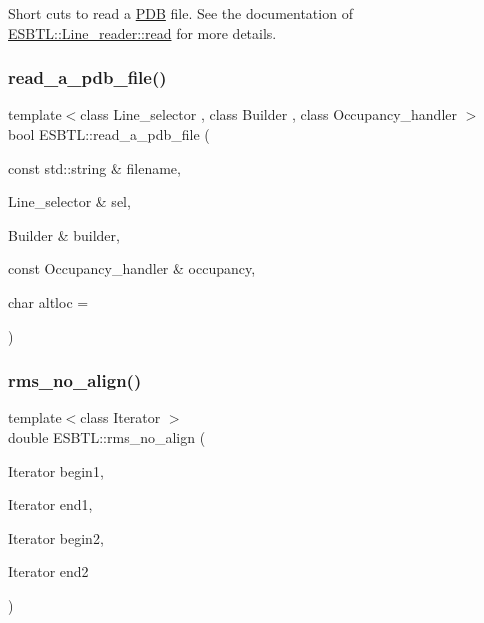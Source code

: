 Short cuts to read a \hyperlink{namespaceESBTL_1_1PDB}{P\+DB} file. See the documentation of \hyperlink{classESBTL_1_1Line__reader_aaf4f352f79c0bc1fc2afb52afd4f751f}{E\+S\+B\+T\+L\+::\+Line\+\_\+reader\+::read} for more details. \mbox{\label{namespaceESBTL_a28936dc2a8755e244e063f40553c1b71}} 
\subsubsection{\texorpdfstring{read\+\_\+a\+\_\+pdb\+\_\+file()}{read\_a\_pdb\_file()}\hspace{0.1cm}{\footnotesize\ttfamily [2/2]}}
{\footnotesize\ttfamily template$<$class Line\+\_\+selector , class Builder , class Occupancy\+\_\+handler $>$ \\
bool E\+S\+B\+T\+L\+::read\+\_\+a\+\_\+pdb\+\_\+file (\begin{DoxyParamCaption}\item[{const std\+::string \&}]{filename,  }\item[{Line\+\_\+selector \&}]{sel,  }\item[{Builder \&}]{builder,  }\item[{const Occupancy\+\_\+handler \&}]{occupancy,  }\item[{char}]{altloc = {\ttfamily \textquotesingle{}~\textquotesingle{}} }\end{DoxyParamCaption})\hspace{0.3cm}{\ttfamily [inline]}}

\mbox{\label{namespaceESBTL_a6f47ecb6c6f49a71b6e621f2d6067b0d}} 
\subsubsection{\texorpdfstring{rms\+\_\+no\+\_\+align()}{rms\_no\_align()}}
{\footnotesize\ttfamily template$<$class Iterator $>$ \\
double E\+S\+B\+T\+L\+::rms\+\_\+no\+\_\+align (\begin{DoxyParamCaption}\item[{Iterator}]{begin1,  }\item[{Iterator}]{end1,  }\item[{Iterator}]{begin2,  }\item[{Iterator}]{end2 }\end{DoxyParamCaption})}

